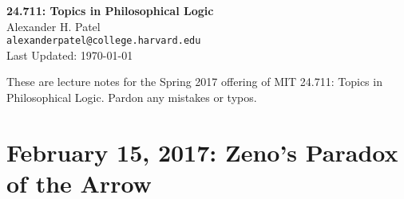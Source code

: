 \documentclass[12pt]{article}
\theoremstyle{definition}
\begin{document}
\begin{center}
\textbf{24.711: Topics in Philosophical Logic} \\
Alexander H. Patel \\
{\tt alexanderpatel@college.harvard.edu} \\
Last Updated: \today
\end{center}

These are lecture notes for the Spring 2017 offering of MIT 24.711: Topics in
Philosophical Logic. Pardon any mistakes or typos.

\tableofcontents

\section{February 15, 2017: Zeno's Paradox of the Arrow}
\end{document}
